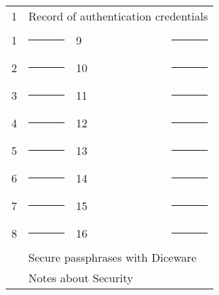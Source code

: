\newpage

\begin{center}

\setlength{\tabcolsep}{4pt}
\begin{tabular}{l l l l }
	1 & \multicolumn{3}{l}{Record of authentication credentials} \vspace{.275in} \\
	1 & \rule{1.25in}{.2pt} &  9 & \rule{1.25in}{.2pt} \vspace{.275in} \\
	2 & \rule{1.25in}{.2pt} & 10 & \rule{1.25in}{.2pt} \vspace{.275in} \\
	3 & \rule{1.25in}{.2pt} & 11 & \rule{1.25in}{.2pt} \vspace{.275in} \\
	4 & \rule{1.25in}{.2pt} & 12 & \rule{1.25in}{.2pt} \vspace{.275in} \\
	5 & \rule{1.25in}{.2pt} & 13 & \rule{1.25in}{.2pt} \vspace{.275in} \\
	6 & \rule{1.25in}{.2pt} & 14 & \rule{1.25in}{.2pt} \vspace{.275in} \\
	7 & \rule{1.25in}{.2pt} & 15 & \rule{1.25in}{.2pt} \vspace{.275in} \\
	8 & \rule{1.25in}{.2pt} & 16 & \rule{1.25in}{.2pt} \vspace{.275in} \\
	\pageref{ch:diceware} & \multicolumn{3}{l}{Secure passphrases with Diceware} \vspace{.15in} \\
	\pageref{ch:qna} & \multicolumn{3}{l}{Notes about Security} \\
\end{tabular}

\end{center}

